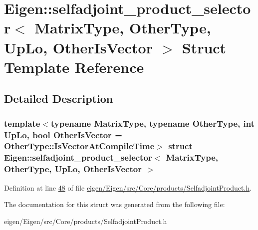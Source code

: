 \hypertarget{struct_eigen_1_1selfadjoint__product__selector}{}\section{Eigen\+:\+:selfadjoint\+\_\+product\+\_\+selector$<$ Matrix\+Type, Other\+Type, Up\+Lo, Other\+Is\+Vector $>$ Struct Template Reference}
\label{struct_eigen_1_1selfadjoint__product__selector}


\subsection{Detailed Description}
\subsubsection*{template$<$typename Matrix\+Type, typename Other\+Type, int Up\+Lo, bool Other\+Is\+Vector = Other\+Type\+::\+Is\+Vector\+At\+Compile\+Time$>$\newline
struct Eigen\+::selfadjoint\+\_\+product\+\_\+selector$<$ Matrix\+Type, Other\+Type, Up\+Lo, Other\+Is\+Vector $>$}



Definition at line \hyperlink{eigen_2_eigen_2src_2_core_2products_2_selfadjoint_product_8h_source_l00048}{48} of file \hyperlink{eigen_2_eigen_2src_2_core_2products_2_selfadjoint_product_8h_source}{eigen/\+Eigen/src/\+Core/products/\+Selfadjoint\+Product.\+h}.



The documentation for this struct was generated from the following file\+:\begin{DoxyCompactItemize}
\item 
eigen/\+Eigen/src/\+Core/products/\+Selfadjoint\+Product.\+h\end{DoxyCompactItemize}
